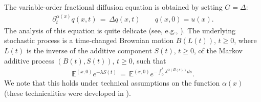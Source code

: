 \documentclass[reqno]{amsart}
\theoremstyle{remark}
\numberwithin{equation}{section} %
\newcommand{\1}{\mathds{1}}
\begin{document}
	The variable-order fractional diffusion equation is obtained by setting $G=\Delta$:
	\begin{align}
		\partial_t^{\alpha(x)} q(x,t) \, = \, \Delta q(x,t) \qquad q(x,0) = u(x).
	\end{align}
	The analysis of this equation is quite delicate (see, e.g., \cite{KIAN20181146, kian2018time}). The underlying stochastic process is a time-changed Brownian motion $B(L(t))$, $t\ge0$, where $L(t)$ is the inverse of the additive component $S(t)$, $t\ge0$, of the Markov additive process $(B(t), S(t))$, $t\ge0$, such that
	\begin{align}
		\mathds{E}^{(x,0)} e^{-\lambda S(t)} \, = \, \mathds{E}^{(x,0)}e^{-\int_0^t \lambda^{\alpha(B(s))}ds}.
	\end{align}
	We note that this holds under technical assumptions on the function $\alpha(x)$ (these technicalities were developed in \cite[Section 3]{savtoa}).
	
\end{document}
